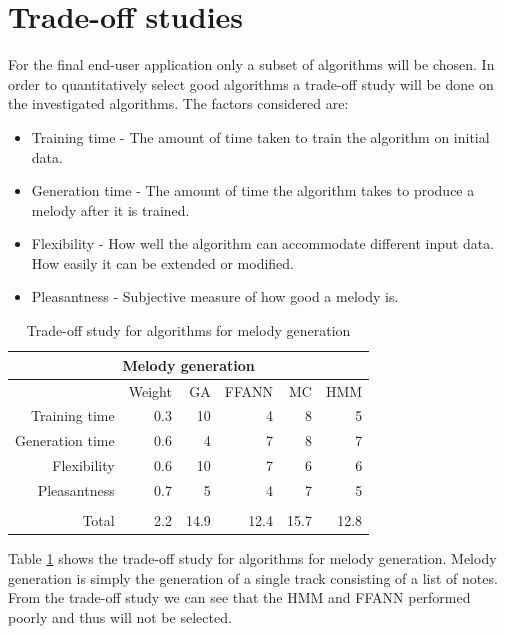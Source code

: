 \section{Trade-off studies}
For the final end-user application only a subset of algorithms will be chosen. In order to quantitatively select good algorithms a trade-off study will be done on the investigated algorithms. The factors considered are:
\begin{itemize}
\item Training time - The amount of time taken to train the algorithm on initial data.
\item Generation time - The amount of time the algorithm takes to produce a melody after it is trained.
\item Flexibility - How well the algorithm can accommodate different input data. How easily it can be extended or modified.
\item Pleasantness - Subjective measure of how good a melody is.
\end{itemize}
\begin{table}[htbp]
  \centering
  \caption{Trade-off study for algorithms for melody generation}
    \begin{tabular}{rr|rrrr}
    \toprule
    \multicolumn{6}{c}{Melody generation} \\
    \midrule
          & Weight & GA    & FFANN & MC    & HMM \\
    \midrule 
    Training time & 0.3   & 10    & 4     & 8     & 5 \\
    Generation time & 0.6   & 4     & 7     & 8     & 7 \\
    Flexibility & 0.6   & 10    & 7     & 6     & 6 \\
    Pleasantness & 0.7   & 5     & 4     & 7     & 5 \\
          &       &       &       &       &  \\
          \bottomrule
    Total & 2.2   & 14.9  & 12.4  & 15.7  & 12.8 \\
    \bottomrule
    \end{tabular}%
  \label{tab:tomelgen}%
\end{table}%

Table \ref{tab:tomelgen} shows the trade-off study for algorithms for melody generation. Melody generation is simply the generation of a single track consisting of a list of notes. From the trade-off study we can see that the \ac{HMM} and \ac{FFANN} performed poorly and thus will not be selected.

